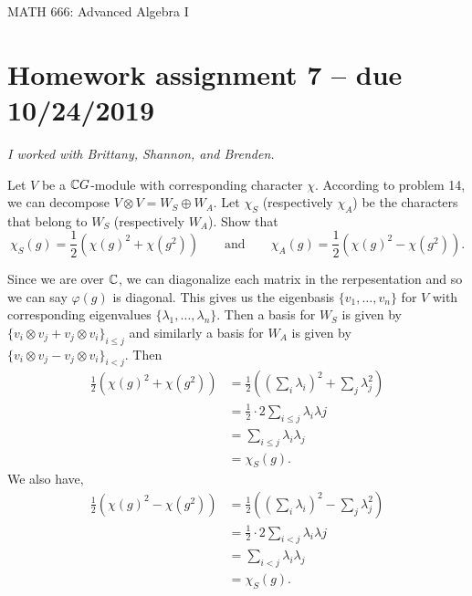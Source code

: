 \documentclass[leqno]{article}
\author{Colin Roberts}
\begin{document}
\begin{center}
  \begin{huge}
    MATH 666: Advanced Algebra I
  \end{huge}
\end{center}

\section*{Homework assignment 7 -- due 10/24/2019}
\noindent \emph{I worked with Brittany, Shannon, and Brenden.}
\setcounter{problem}{28}

\begin{problem}
Let $V$ be a $\mathbb{C} G$-module with corresponding character $\chi$. According to problem 14, we can decompose $V\otimes V = W_S \oplus W_A$. Let $\chi_S$ (respectively $\chi_A$) be the characters that belong to $W_S$ (respectively $W_A$). Show that
\[
\chi_S(g) = \frac{1}{2} \left( \chi(g)^2+\chi(g^2)\right) \qquad \textrm{and} \qquad \chi_A(g)=\frac{1}{2}\left( \chi(g)^2-\chi(g^2)\right).
\]
\end{problem}
\begin{solution}
Since we are over $\mathbb{C}$, we can diagonalize each matrix in the rerpesentation and so we can say $\varphi(g)$ is diagonal. This gives us the eigenbasis $\{v_1,\dots,v_n\}$ for $V$ with corresponding eigenvalues $\{\lambda_1,\dots,\lambda_n\}$. Then a basis for $W_S$ is given by $\{v_i \otimes v_j + v_j \otimes v_i\}_{i\leq j}$ and similarly a basis for $W_A$ is given by $\{v_i \otimes v_j - v_j \otimes v_i\}_{i<j}$. Then
\begin{align*}
    \frac{1}{2}\left( \chi(g)^2+\chi(g^2)\right)&= \frac{1}{2} \left( \left( \sum_{i} \lambda_i \right)^2 + \sum_{j} \lambda_j^2 \right)\\
    &= \frac{1}{2} \cdot 2 \sum_{i\leq j} \lambda_i \lambda j\\
    &= \sum_{i\leq j}\lambda_i \lambda_j\\
    &= \chi_S(g).
\end{align*}
We also have,
\begin{align*}
    \frac{1}{2}\left( \chi(g)^2-\chi(g^2)\right)&= \frac{1}{2} \left( \left( \sum_{i} \lambda_i \right)^2 - \sum_{j} \lambda_j^2 \right)\\
    &= \frac{1}{2} \cdot 2 \sum_{i<j} \lambda_i \lambda j\\
    &= \sum_{i< j}\lambda_i \lambda_j\\
    &= \chi_S(g).
\end{align*}
\end{solution}
\end{document}

